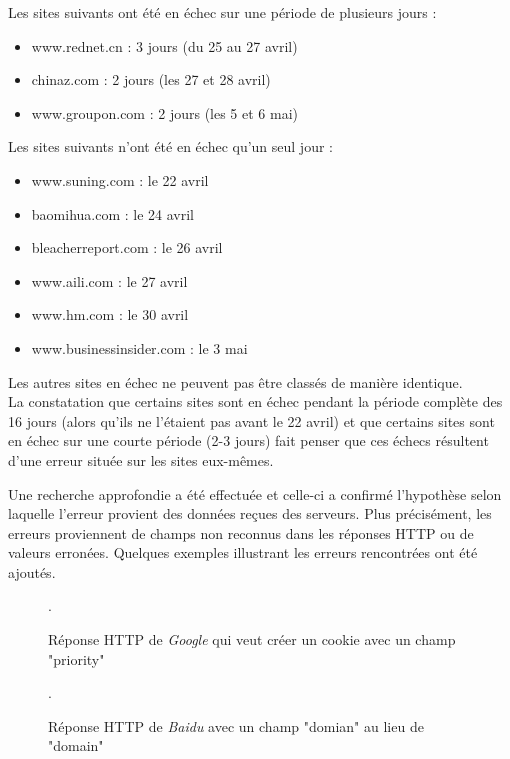 Les sites suivants ont été en échec sur une période de plusieurs jours :
\begin{itemize}
  \item www.rednet.cn : 3 jours (du 25 au 27 avril)
  \item chinaz.com : 2 jours (les 27 et 28 avril)
  \item www.groupon.com : 2 jours (les 5 et 6 mai)
  \newline
\end{itemize}
Les sites suivants n'ont été en échec qu'un seul jour :
\begin{itemize}
  \item www.suning.com : le 22 avril
  \item baomihua.com : le 24 avril
  \item bleacherreport.com : le 26 avril
  \item www.aili.com : le 27 avril
  \item www.hm.com : le 30 avril
  \item www.businessinsider.com : le 3 mai
  \newline
\end{itemize}
Les autres sites en échec ne peuvent pas être classés de manière identique.\\

La constatation que certains sites sont en échec pendant la période complète des 16 jours (alors qu'ils ne l'étaient pas avant le 22 avril) et que certains sites sont en échec sur une courte période (2-3 jours) fait penser que ces échecs résultent d'une erreur située sur les sites eux-mêmes.
\newline

Une recherche approfondie a été effectuée et celle-ci a confirmé l'hypothèse selon laquelle l'erreur provient des données reçues des serveurs. Plus précisément, les erreurs proviennent de champs non reconnus dans les réponses HTTP ou de valeurs erronées. Quelques exemples illustrant les erreurs rencontrées ont été ajoutés.
\newline

\begin{figure}[h]
	\centering
	
	\caption{\label{bad_field_google}Réponse HTTP de \textit{Google} qui veut créer un cookie avec un champ "priority"}.
\end{figure}

\begin{figure}[h]
	\centering
	
	\caption{\label{bad_field_baidu}Réponse HTTP de \textit{Baidu} avec un champ "domian" au lieu de "domain"}.
\end{figure}

